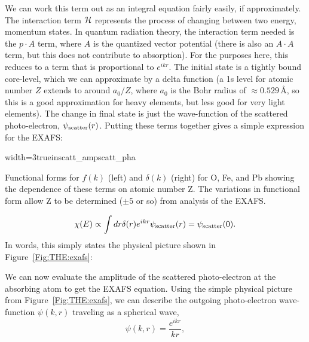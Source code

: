 We can work this term out as an integral equation fairly easily, if
approximately.  The interaction term ${\cal{H}}$ represents the process of
changing between two energy, momentum states.  In quantum radiation theory,
the interaction term needed is the ${p{\cdot}A}$ term, where ${A}$ is the
quantized vector potential (there is also an ${A{\cdot}A}$ term, but this
does not contribute to absorption).  For the purposes here, this reduces to
a term that is proportional to $e^{ikr}$.  The initial state is a tightly
bound core-level, which we can approximate by a delta function (a 1s level
for atomic number $Z$ extends to around $a_0 / Z$, where $a_0$ is the Bohr
radius of $\approx 0.529\,\text{\AA}$, so this is a good approximation for
heavy elements, but less good for very light elements).  The change in
final state is just the wave-function of the scattered photo-electron,
$\psi_{\rm{scatter}}(r)$.  Putting these terms together gives a simple
expression for the EXAFS:

\begin{Sfig}{width=3truein}{scatt_amp}{scatt_pha}
  \caption{Functional forms for $f(k)$ (left) and $\delta(k)$ (right) for
    O, Fe, and Pb showing the dependence of these terms on atomic number
    Z. The variations in functional form allow Z to be determined ($\pm 5$
    or so) from analysis of the EXAFS.}
  \label{Fig:THE:scatt}
\end{Sfig}

\begin{equation}
\chi(E) \propto \int dr \delta(r) e^{ikr}
      \psi_{\rm{scatter}}(r)  =  \psi_{\rm{scatter}}(0).
\end{equation}
\noindent
In words, this simply states the physical picture shown in
Figure~\ref{Fig:THE:exafs}:

\begin{center}
\end{center}


We can now evaluate the amplitude of the scattered photo-electron at the
absorbing atom to get the EXAFS equation.  Using the simple physical
picture from Figure~\ref{Fig:THE:exafs}, we can describe the outgoing
photo-electron wave-function $\psi(k,r)$ traveling as a spherical wave,
\begin{equation}
  \psi(k,r) = {\frac{e^{ikr}}{kr}},
  \label{Eq:spherical}
\end{equation}

